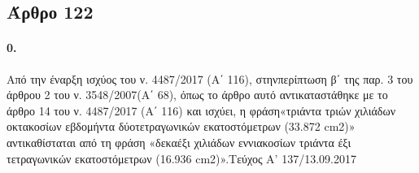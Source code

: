 \documentclass[a4paper,oneside, 10pt]{book}
\begin{document}
\subsection*{ Άρθρο 122 }
\paragraph { 0. } Από την έναρξη ισχύος του ν. 4487/2017 (Α΄ 116), στηνπερίπτωση β΄ της παρ. 3 του άρθρου 2 του ν. 3548/2007(Α΄ 68), όπως το άρθρο αυτό αντικαταστάθηκε με το άρθρο 14 του ν. 4487/2017 (Α΄ 116) και ισχύει, η φράση«τριάντα τριών χιλιάδων οκτακοσίων εβδομήντα δύοτετραγωνικών εκατοστόμετρων (33.872 cm2)» αντικαθίσταται από τη φράση «δεκαέξι χιλιάδων εννιακοσίων τριάντα έξι τετραγωνικών εκατοστόμετρων (16.936 cm2)».Τεύχος Α’ 137/13.09.2017
\end{document}
